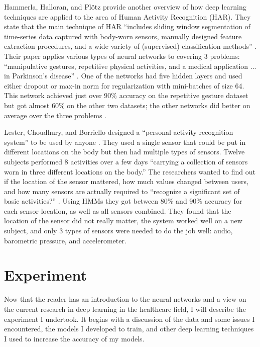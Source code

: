 \documentclass[]{report}
\begin{document}
Hammerla, Halloran, and Plötz provide another overview of how deep learning techniques are applied to the area of Human Activity Recognition (HAR). They state that the main technique of HAR ``includes sliding window segmentation of time-series data captured with body-worn sensors, manually designed feature extraction procedures, and a wide variety of (supervised) classification methods'' \cite{Hammerla}. Their paper applies various types of neural networks to covering 3 problems: ``manipulative gestures, repetitive physical activities, and a medical application ... in Parkinson’s disease'' \cite{Hammerla}. One of the networks had five hidden layers and used either dropout or max-in norm for regularization with mini-batches of size 64. This network achieved just over 90\% accuracy on the repetitive gesture dataset but got almost 60\% on the other two datasets; the other networks did better on average over the three problems \cite{Hammerla}.

Lester, Choudhury, and Borriello designed a ``personal activity recognition system'' to be used by anyone \cite{Lester2006}. They used a single sensor that could be put in different locations on the body but then had multiple types of sensors. Twelve subjects performed 8 activities over a few days ``carrying a collection of sensors worn in three different locations on the body.” The researchers wanted to find out if the location of the sensor mattered, how much values changed between users, and how many sensors are actually required to “recognize a significant set of basic activities?'' \cite{Lester2006}.
Using HMMs they got between 80\% and 90\% accuracy for each sensor location, as well as all sensors combined. They found that the location of the sensor did not really matter, the system worked well on a new subject, and only 3 types of sensors were needed to do the job well: audio, barometric pressure, and accelerometer.


\chapter{Experiment}

Now that the reader has an introduction to the neural networks and a view on the current research in deep learning in the healthcare field, I will describe the experiment I undertook. It begins with a discussion of the data and some issues I encountered, the models I developed to train, and other deep learning techniques I used to increase the accuracy of my models.
\end{document}
